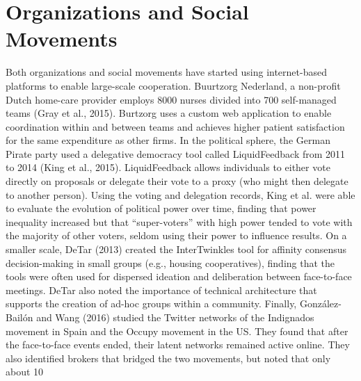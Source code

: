 \section{Organizations and Social Movements}
Both organizations and social movements have started using internet-based platforms to enable large-scale cooperation. Buurtzorg Nederland, a non-profit Dutch home-care provider employs 8000 nurses divided into 700 self-managed teams (Gray et al., 2015). Burtzorg uses a custom web application to enable coordination within and between teams and achieves higher patient satisfaction for the same expenditure as other firms. In the political sphere, the German Pirate party used a delegative democracy tool called LiquidFeedback from 2011 to 2014 (King et al., 2015). LiquidFeedback allows individuals to either vote directly on proposals or delegate their vote to a proxy (who might then delegate to another person). Using the voting and delegation records, King et al. were able to evaluate the evolution of political power over time, finding that power inequality increased but that ``super-voters'' with high power tended to vote with the majority of other voters, seldom using their power to influence results. On a smaller scale, DeTar (2013) created the InterTwinkles tool for affinity consensus decision-making in small groups (e.g., housing cooperatives), finding that the tools were often used for dispersed ideation and deliberation between face-to-face meetings. DeTar also noted the importance of technical architecture that supports the creation of ad-hoc groups within a community. Finally, Gonz\'alez-Bail\'on and Wang (2016) studied the Twitter networks of the Indignados movement in Spain and the Occupy movement in the US. They found that after the face-to-face events ended, their latent networks remained active online. They also identified brokers that bridged the two movements, but noted that only about 10%

